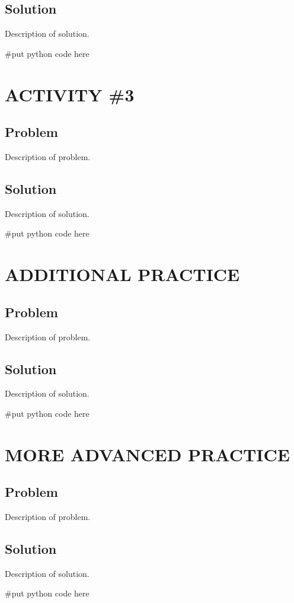 \documentclass[14pt]{extreport}%
\begin{document}
\subsection*{Solution}
Description of solution.\\
\begin{python}
#put python code here
\end{python}

\section*{ACTIVITY \#3} 
\subsection*{Problem}
Description of problem.
\subsection*{Solution}
Description of solution. \\
\begin{python}
#put python code here
\end{python}

\section*{ADDITIONAL PRACTICE} 
\subsection*{Problem}
Description of problem.
\subsection*{Solution}
Description of solution. \\
\begin{python}
#put python code here
\end{python}

\section*{MORE ADVANCED PRACTICE} 
\subsection*{Problem}
Description of problem.
\subsection*{Solution}
Description of solution. \\
\begin{python}
#put python code here
\end{python}
\end{document}
